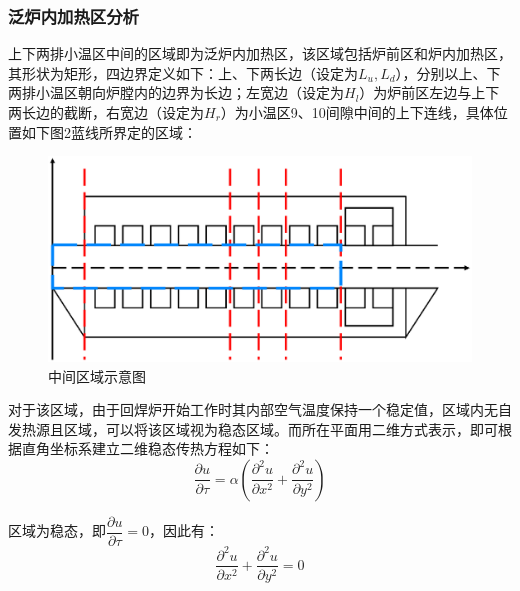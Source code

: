 \documentclass[a4paper,12pt]{ctexart} %
\begin{document}
	\subsubsection{泛炉内加热区分析}
	上下两排小温区中间的区域即为泛炉内加热区，该区域包括炉前区和炉内加热区，其形状为矩形，四边界定义如下：上、下两长边（设定为$L_u,L_d$），分别以上、下两排小温区朝向炉膛内的边界为长边；左宽边（设定为$H_l$）为炉前区左边与上下两长边的截断，右宽边（设定为$H_r$）为小温区9、10间隙中间的上下连线，具体位置如下图2蓝线所界定的区域：
		\begin{figure}[H]
		\centering
		\includegraphics[scale=0.3]{Q1-2}
		\caption{中间区域示意图}
	\end{figure}\par
	对于该区域，由于回焊炉开始工作时其内部空气温度保持一个稳定值，区域内无自发热源且区域，可以将该区域视为稳态区域。而所在平面用二维方式表示，即可根据直角坐标系建立二维稳态传热方程如下\cite{ref2}：
	\begin{equation}\label{e1}
	\dfrac{\partial u}{\partial\tau}=\alpha\left(\dfrac{\partial^2 u}{\partial x^2}+\dfrac{\partial^2 u}{\partial y^2}\right)
	\end{equation}\par
	区域为稳态，即$\dfrac{\partial u}{\partial\tau}=0$，因此有：
	\begin{equation}
	\dfrac{\partial^2 u}{\partial x^2}+\dfrac{\partial^2 u}{\partial y^2}=0
	\end{equation}\par
\end{document}
